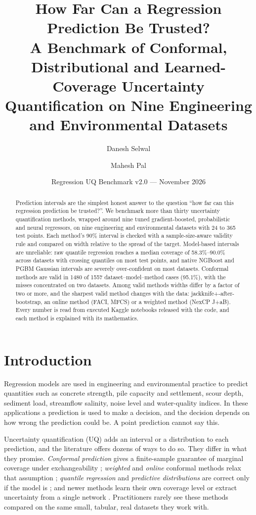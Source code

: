 \documentclass[11pt]{article}
\title{How Far Can a Regression Prediction Be Trusted?\\[2pt] \large A Benchmark of Conformal, Distributional and Learned-Coverage Uncertainty Quantification on Nine Engineering and Environmental Datasets}
\author{Danesh Selwal \and Mahesh Pal}
\date{Regression UQ Benchmark v2.0 --- November 2026}
\begin{document}
\maketitle
\begin{abstract}Prediction intervals are the simplest honest answer to the question ``how far can this regression prediction be trusted?''. We benchmark more than thirty uncertainty quantification methods, wrapped around nine tuned gradient-boosted, probabilistic and neural regressors, on nine engineering and environmental datasets with 24 to 365 test points. Each method's 90\% interval is checked with a sample-size-aware validity rule and compared on width relative to the spread of the target. Model-based intervals are unreliable: raw quantile regression reaches a median coverage of 58.3\%--90.0\% across datasets with crossing quantiles on most test points, and native NGBoost and PGBM Gaussian intervals are severely over-confident on most datasets. Conformal methods are valid in 1480 of 1557 dataset--model--method cases (95.1\%), with the misses concentrated on two datasets. Among valid methods widths differ by a factor of two or more, and the sharpest valid method changes with the data: jackknife+-after-bootstrap, an online method (FACI, MFCS) or a weighted method (NexCP J+aB). Every number is read from executed Kaggle notebooks released with the code, and each method is explained with its mathematics.\end{abstract}
\tableofcontents
\newpage
\section{Introduction}
Regression models are used in engineering and environmental practice to predict quantities such as concrete strength, pile capacity and
settlement, scour depth, sediment load, streamflow salinity, noise level and water-quality indices. In these applications a prediction is
used to make a decision, and the decision depends on how wrong the prediction could be. A point prediction cannot say this.

Uncertainty quantification (UQ) adds an interval or a distribution to each prediction, and the literature offers dozens of ways to do so.
They differ in what they promise. \emph{Conformal prediction} gives a finite-sample guarantee of marginal coverage under exchangeability
\cite{vovk2005alrw,lei2018distribution,angelopoulos2023gentle}; \emph{weighted} and \emph{online} conformal methods relax that assumption
\cite{barber2023beyond,gibbs2021aci}; \emph{quantile regression} and \emph{predictive distributions} are correct only if the model is
\cite{koenker1978quantile,duan2020ngboost}; and newer methods learn their own coverage level \cite{gauthier2026acp} or extract uncertainty from a
single network \cite{choi2026hcm}. Practitioners rarely see these methods compared on the same small, tabular, real datasets they work with.
\end{document}
